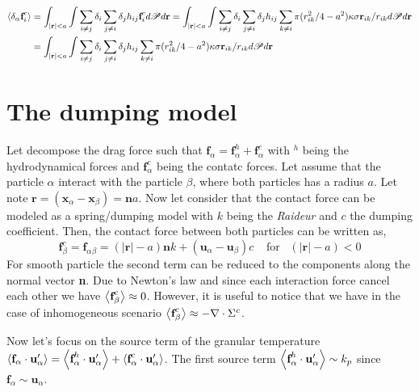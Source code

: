 \begin{align}    
\left<\delta_\alpha \textbf{f}_i^c\right>
&= \int_{|\textbf{r}|<a}
\int \sum_{i \neq j} \delta_i \sum_{j\neq i} \delta_j h_{ij}
\textbf{f}_i^c d\mathscr{P} d\textbf{r}
= \int_{|\textbf{r}|<a}
\int \sum_{i \neq j} \delta_i \sum_{j\neq i} \delta_j h_{ij}
\sum_{k\neq i} \pi (r_{ik}^2/4 - a^2) \kappa \sigma \textbf{r}_{ik}/r_{ik} d\mathscr{P} d\textbf{r}\\
&= \int_{|\textbf{r}|<a}
\int \sum_{i \neq j} \delta_i \sum_{j\neq i} \delta_j h_{ij}
\sum_{k\neq i} \pi (r_{ik}^2/4 - a^2) \kappa \sigma \textbf{r}_{ik}/r_{ik} d\mathscr{P} d\textbf{r}
\\
\end{align}

\section{The dumping model}

Let decompose the drag force such that $\textbf{f}_\alpha = \textbf{f}_\alpha^h + \textbf{f}_\alpha^c$ with $^h$ being the hydrodynamical forces and $\textbf{f}^c_\alpha$ being the contatc forces. 
Let assume that the particle $\alpha$ interact with the particle $\beta$, where both particles has a radius $a$.
Let note $\textbf{r} = (\textbf{x}_\alpha - \textbf{x}_\beta) = \textbf{n} a$. 
Now let consider that the contact force can be modeled as a spring/dumping model with $k$ being the \textit{Raideur} and $c$ the dumping coefficient.
Then, the contact force between both particles can be written as, 
\begin{equation}
    \textbf{f}_\beta^c
    = \textbf{f}_{\alpha\beta}
    = (|\textbf{r}| - a) \textbf{n} k 
    + (\textbf{u}_\alpha - \textbf{u}_\beta) c
    \;\;\;\;\text{for} \;\;\; (|\textbf{r}| - a) < 0
\end{equation}
For smooth particle the second term can be reduced to the components along the normal vector \textbf{n}.  
Due to Newton's  law and since each interaction force cancel each other we have $\left<\textbf{f}_\beta^c\right> \approx 0$. 
However, it is useful to notice that we have in the case of inhomogeneous scenario $\left<\textbf{f}_\beta^c\right> \approx - \mathbf{\nabla}\cdot \Sigma^c$.

Now let's focus on the source term of the granular temperature $\left<\textbf{f}_\alpha\cdot \textbf{u}_\alpha'\right> = \left<\textbf{f}_\alpha^h \cdot \textbf{u}_\alpha'\right> + \left<\textbf{f}_\alpha^c\cdot \textbf{u}_\alpha'\right>$. 
The first source term $\left<\textbf{f}_\alpha^h \cdot \textbf{u}_\alpha'\right> \sim k_p$ since $\textbf{f}_\alpha \sim \textbf{u}_\alpha$.

